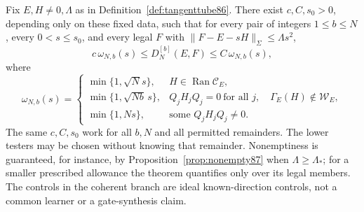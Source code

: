\begin{theorem}\label{thm:widthlaw87}
Fix $E,H\ne0,\Lambda$ as in Definition~\ref{def:tangenttube86}.
There exist $c,C,s_0>0$, depending only on these fixed data, such that
for every pair of integers $1\le b\le N$, every $0<s\le s_0$,
and every legal $F$ with $\|F-E-sH\|_{\Sigma}\le\Lambda s^2$,
\begin{equation}\label{eq:widthlaw87}
 c\,\omega_{N,b}(s)\le D_N^{[b]}(E,F)\le C\,\omega_{N,b}(s),
\end{equation}
where
\[
 \omega_{N,b}(s)=
 \begin{cases}
 \min\{1,\sqrt N s\},&H\in\operatorname{Ran}\mathcal C_E,\\
 \min\{1,\sqrt{Nb}\,s\},&Q_jH_jQ_j=0\ \text{for all }j,
                                  \quad\Gamma_E(H)\notin\mathcal W_E,\\
 \min\{1,Ns\},&\text{some }Q_jH_jQ_j\ne0.
 \end{cases}
\]
The same $c,C,s_0$ work for all $b,N$ and all permitted remainders.
The lower testers may be chosen without knowing that remainder.
Nonemptiness is guaranteed, for instance, by
Proposition~\ref{prop:nonempty87} when $\Lambda\ge\Lambda_*$;
for a smaller prescribed allowance the theorem quantifies only over
its legal members.  The controls in the coherent branch are ideal
known-direction controls, not a common learner or a gate-synthesis
claim.
\end{theorem}
